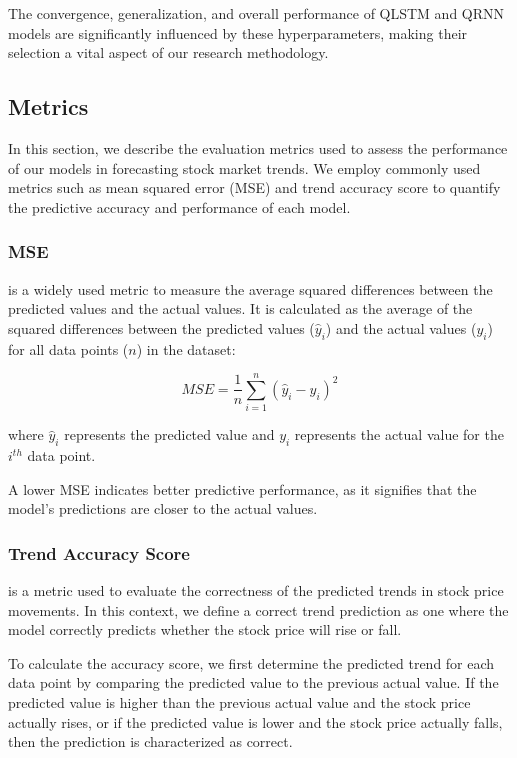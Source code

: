 The convergence, generalization, and overall performance of QLSTM and QRNN models are significantly influenced by these hyperparameters, making their selection a vital aspect of our research methodology.

\subsection{Metrics}
In this section, we describe the evaluation metrics used to assess the performance of our models in forecasting stock market trends. We employ commonly used metrics such as mean squared error (MSE) and trend accuracy score to quantify the predictive accuracy and performance of each model. 

\subsubsection{MSE}

is a widely used metric to measure the average squared differences between the predicted values and the actual values. It is calculated as the average of the squared differences between the predicted values ($\hat{y}_i$) and the actual values ($y_i$) for all data points ($n$) in the dataset:

\[
MSE = \frac{1}{n} \sum_{i=1}^{n} (\hat{y}_i - y_i)^2
\]

where $\hat{y}_i$ represents the predicted value and $y_i$ represents the actual value for the $i^{th}$ data point.

A lower MSE indicates better predictive performance, as it signifies that the model's predictions are closer to the actual values.

\subsubsection{Trend Accuracy Score}

is a metric used to evaluate the correctness of the predicted trends in stock price movements. In this context, we define a correct trend prediction as one where the model correctly predicts whether the stock price will rise or fall. 

To calculate the accuracy score, we first determine the predicted trend for each data point by comparing the predicted value to the previous actual value. If the predicted value is higher than the previous actual value and the stock price actually rises, or if the predicted value is lower and the stock price actually falls, then the prediction is characterized as correct. 


